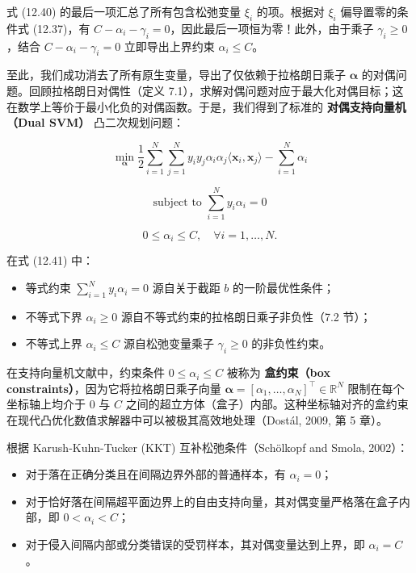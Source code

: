 式 (12.40) 的最后一项汇总了所有包含松弛变量 $ \xi_i $ 的项。根据对 $ \xi_i $ 偏导置零的条件式 (12.37)，有 $ C - \alpha_i - \gamma_i = 0 $，因此最后一项恒为零！此外，由于乘子 $ \gamma_i \geqslant 0 $，结合 $ C - \alpha_i - \gamma_i = 0 $ 立即导出上界约束 $ \alpha_i \leqslant C $。

至此，我们成功消去了所有原生变量，导出了仅依赖于拉格朗日乘子 $ \boldsymbol{\alpha} $ 的对偶问题。回顾拉格朗日对偶性（定义 7.1），求解对偶问题对应于最大化对偶目标；这在数学上等价于最小化负的对偶函数。于是，我们得到了标准的 \textbf{对偶支持向量机（Dual SVM）} 凸二次规划问题：

\begin{equation}
\min_{\boldsymbol{\alpha}} \frac{1}{2} \sum_{i=1}^N \sum_{j=1}^N y_i y_j \alpha_i \alpha_j \langle \boldsymbol{x}_i, \boldsymbol{x}_j \rangle - \sum_{i=1}^N \alpha_i
\tag{12.41}
\end{equation}

\begin{equation*}
\text{subject to } \sum_{i=1}^N y_i \alpha_i = 0
\end{equation*}

\begin{equation*}
0 \leqslant \alpha_i \leqslant C , \quad \forall i = 1, \ldots, N .
\end{equation*}

在式 (12.41) 中：

\begin{itemize}
\item 等式约束 $ \sum_{i=1}^N y_i \alpha_i = 0 $ 源自关于截距 $ b $ 的一阶最优性条件；
\item 不等式下界 $ \alpha_i \geqslant 0 $ 源自不等式约束的拉格朗日乘子非负性（7.2 节）；
\item 不等式上界 $ \alpha_i \leqslant C $ 源自松弛变量乘子 $ \gamma_i \geqslant 0 $ 的非负性约束。
\end{itemize}

在支持向量机文献中，约束条件 $ 0 \leqslant \alpha_i \leqslant C $ 被称为 \textbf{盒约束（box constraints）}，因为它将拉格朗日乘子向量 $ \boldsymbol{\alpha} = [\alpha_1, \ldots, \alpha_N]^\top \in \mathbb{R}^N $ 限制在每个坐标轴上均介于 $ 0 $ 与 $ C $ 之间的超立方体（盒子）内部。这种坐标轴对齐的盒约束在现代凸优化数值求解器中可以被极其高效地处理（Dostál, 2009, 第 5 章）。

根据 Karush-Kuhn-Tucker (KKT) 互补松弛条件（Schölkopf and Smola, 2002）：

\begin{itemize}
\item 对于落在正确分类且在间隔边界外部的普通样本，有 $ \alpha_i = 0 $；
\item 对于恰好落在间隔超平面边界上的自由支持向量，其对偶变量严格落在盒子内部，即 $ 0 < \alpha_i < C $；
\item 对于侵入间隔内部或分类错误的受罚样本，其对偶变量达到上界，即 $ \alpha_i = C $。
\end{itemize}

